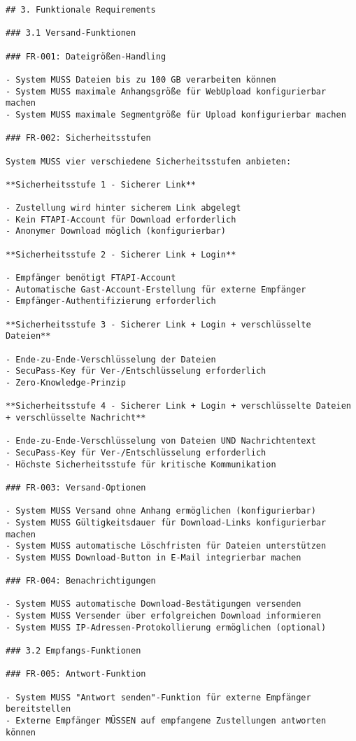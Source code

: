 \begin{verbatim}
## 3. Funktionale Requirements

### 3.1 Versand-Funktionen

### FR-001: Dateigrößen-Handling

- System MUSS Dateien bis zu 100 GB verarbeiten können
- System MUSS maximale Anhangsgröße für WebUpload konfigurierbar machen
- System MUSS maximale Segmentgröße für Upload konfigurierbar machen

### FR-002: Sicherheitsstufen

System MUSS vier verschiedene Sicherheitsstufen anbieten:

**Sicherheitsstufe 1 - Sicherer Link**

- Zustellung wird hinter sicherem Link abgelegt
- Kein FTAPI-Account für Download erforderlich
- Anonymer Download möglich (konfigurierbar)

**Sicherheitsstufe 2 - Sicherer Link + Login**

- Empfänger benötigt FTAPI-Account
- Automatische Gast-Account-Erstellung für externe Empfänger
- Empfänger-Authentifizierung erforderlich

**Sicherheitsstufe 3 - Sicherer Link + Login + verschlüsselte Dateien**

- Ende-zu-Ende-Verschlüsselung der Dateien
- SecuPass-Key für Ver-/Entschlüsselung erforderlich
- Zero-Knowledge-Prinzip

**Sicherheitsstufe 4 - Sicherer Link + Login + verschlüsselte Dateien + verschlüsselte Nachricht**

- Ende-zu-Ende-Verschlüsselung von Dateien UND Nachrichtentext
- SecuPass-Key für Ver-/Entschlüsselung erforderlich
- Höchste Sicherheitsstufe für kritische Kommunikation

### FR-003: Versand-Optionen

- System MUSS Versand ohne Anhang ermöglichen (konfigurierbar)
- System MUSS Gültigkeitsdauer für Download-Links konfigurierbar machen
- System MUSS automatische Löschfristen für Dateien unterstützen
- System MUSS Download-Button in E-Mail integrierbar machen

### FR-004: Benachrichtigungen

- System MUSS automatische Download-Bestätigungen versenden
- System MUSS Versender über erfolgreichen Download informieren
- System MUSS IP-Adressen-Protokollierung ermöglichen (optional)

### 3.2 Empfangs-Funktionen

### FR-005: Antwort-Funktion

- System MUSS "Antwort senden"-Funktion für externe Empfänger bereitstellen
- Externe Empfänger MÜSSEN auf empfangene Zustellungen antworten können


\end{verbatim}
